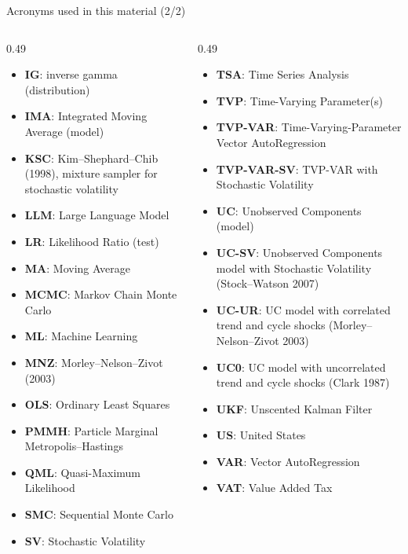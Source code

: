 \begin{frame}{Acronyms used in this material (2/2)}
\begin{columns}[T]
\begin{column}{0.49\textwidth}
\begin{itemize}\setlength{\itemsep}{0pt}
    \item \textbf{IG}: inverse gamma (distribution)
    \item \textbf{IMA}: Integrated Moving Average (model)
    \item \textbf{KSC}: Kim–Shephard–Chib (1998), mixture sampler for stochastic volatility
    \item \textbf{LLM}: Large Language Model
    \item \textbf{LR}: Likelihood Ratio (test)
    \item \textbf{MA}: Moving Average
    \item \textbf{MCMC}: Markov Chain Monte Carlo
    \item \textbf{ML}: Machine Learning
    \item \textbf{MNZ}: Morley–Nelson–Zivot (2003)
    \item \textbf{OLS}: Ordinary Least Squares
    \item \textbf{PMMH}: Particle Marginal Metropolis–Hastings
    \item \textbf{QML}: Quasi-Maximum Likelihood
    \item \textbf{SMC}: Sequential Monte Carlo
    \item \textbf{SV}: Stochastic Volatility
\end{itemize}
\end{column}
\begin{column}{0.49\textwidth}
\begin{itemize}\setlength{\itemsep}{0pt}
    \item \textbf{TSA}: Time Series Analysis
    \item \textbf{TVP}: Time-Varying Parameter(s)
    \item \textbf{TVP-VAR}: Time-Varying-Parameter Vector AutoRegression
    \item \textbf{TVP-VAR-SV}: TVP-VAR with Stochastic Volatility
    \item \textbf{UC}: Unobserved Components (model)
    \item \textbf{UC-SV}: Unobserved Components model with Stochastic Volatility (Stock–Watson 2007)
    \item \textbf{UC-UR}: UC model with correlated trend and cycle shocks (Morley–Nelson–Zivot 2003)
    \item \textbf{UC0}: UC model with uncorrelated trend and cycle shocks (Clark 1987)
    \item \textbf{UKF}: Unscented Kalman Filter
    \item \textbf{US}: United States
    \item \textbf{VAR}: Vector AutoRegression
    \item \textbf{VAT}: Value Added Tax
\end{itemize}
\end{column}
\end{columns}
\end{frame}
